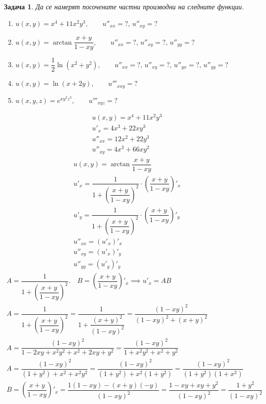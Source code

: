 \documentclass[a4paper,fleqn,12pt]{article}
\newtheorem{task}{Задача}[section]
\begin{document}
\begin{task}
Да се намерят посочените частни производни на следните функции.\\
\begin{enumerate}
\item $u(x,y) = x^4 + 11x^2y^3, \qquad u''_{xx} = ?,\, u''_{xy} = ?$ 
\item $u(x,y) = \arctan{\dfrac{x+y}{1-xy}}, \qquad u''_{xx} = ?,\, u''_{xy} = ?,\,u''_{yy} = ?$
\item $u(x,y) = \dfrac{1}{2} \ln{(x^2 + y^2)}, \qquad u''_{xx} = ?,\, u''_{xy} = ?,\,u''_{yx} = ?,\,u''_{yy} = ?$
\item $u(x,y) = \ln{(x + 2y)}, \qquad u'''_{xxy} = ?$
\item $u(x,y,z) = e^{xy^2z^3}, \qquad u'''_{xyz} = ?$
\end{enumerate}
\begin{gather*}
u(x,y) = x^4 + 11x^2y^3 \\
u'_x = 4x^3 + 22xy^3 \\
u''_{xx} = 12x^2 + 22y^3 \\
u''_{xy} = 4x^3 + 66xy^2 
\end{gather*}
\begin{gather*}
u(x,y) = \arctan{\dfrac{x+y}{1-xy}}\\
u'_x = \dfrac{1}{1 + \left( \dfrac{x+y}{1-xy} \right)^2} \cdot  \left( \dfrac{x+y}{1-xy} \right)'_x\\
u'_y = \dfrac{1}{1 + \left( \dfrac{x+y}{1-xy} \right)^2} \cdot  \left( \dfrac{x+y}{1-xy} \right)'_y\\
u''_{xx} = (u'_x)'_x\\
u''_{xy} = (u'_x)'_y\\
u''_{yy} = (u'_y)'_y
\end{gather*}
\begin{gather*}
A = \dfrac{1}{1 + \left( \dfrac{x+y}{1-xy} \right)^2}. \quad B = \left( \dfrac{x+y}{1-xy} \right)'_x \implies u'_x = AB\\
A = \dfrac{1}{1 + \left( \dfrac{x+y}{1-xy} \right)^2} =\dfrac{1}{1 + \dfrac{(x+y)^2}{(1-xy)^2}} = \dfrac{(1-xy)^2}{(1-xy)^2 + (x+y)^2}\\ 
A = \dfrac{(1-xy)^2}{1 - 2xy + x^2y^2 + x^2 + 2xy + y^2} = \dfrac{(1-xy)^2}{1 + x^2y^2 + x^2 + y^2}\\
A = \dfrac{(1-xy)^2}{(1 + y^2) + x^2 + x^2y^2} = \dfrac{(1-xy)^2}{(1 + y^2) + x^2(1 +y^2)} = \dfrac{(1-xy)^2}{(1 + y^2) (1 + x^2)}\\
B = \left( \dfrac{x+y}{1-xy} \right)'_x = \dfrac{1(1-xy) - (x+y)(-y)}{(1 - xy)^2} = \dfrac {1-xy + xy + y^2}{(1 - xy)^2} =\dfrac {1+y^2}{(1 - xy)^2}  \\

\end{gather*}
\end{task}
\end{document}
